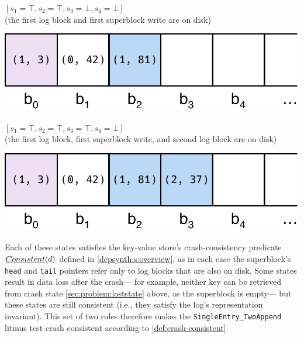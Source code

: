 \begin{example}
\begin{enumerate}[label={\raisebox{2\baselineskip}[0pt][0pt]{(\arabic*)}},ref=(\arabic*)]
\item 
\begin{minipage}[b]{0.5\textwidth}
$[s_1 = \top, s_2 = \top, s_3 = \bot, s_4 = \bot]$\\
(the first log block and first superblock write are on disk)
\end{minipage}\quad%
\begin{minipage}{0.4\textwidth}
\vspace{-1.2em}
\includegraphics[width=\textwidth]{figs/sec3-4.pdf}
\end{minipage}

\item 
\begin{minipage}[b]{0.5\textwidth}
$[s_1 = \top, s_2 = \top, s_3 = \top, s_4 = \bot]$\\
(the first log block, first superblock write, and second log block are on disk)
\end{minipage}\quad%
\begin{minipage}{0.4\textwidth}
\vspace{-1.2em}
\includegraphics[width=\textwidth]{figs/sec3-5.pdf}
\end{minipage}
\end{enumerate}
%
Each of these states satisfies the key-value store's crash-consistency predicate $\emph{Consistent}(d)$
defined in \cref{depsynth:s:overview},
as in each case the superblock's \texttt{head} and \texttt{tail} pointers
refer only to log blocks that are also on disk.
Some states result in data loss after the crash---%
for example, neither key can be retrieved from crash state \ref{sec:problem:loststate} above, as the superblock is empty---%
but these states are still consistent
(i.e., they satisfy the log's representation invariant).
This set of two rules therefore makes the \texttt{SingleEntry_TwoAppend} litmus test crash consistent according to \cref{def:crash-consistent}.


\end{example}
